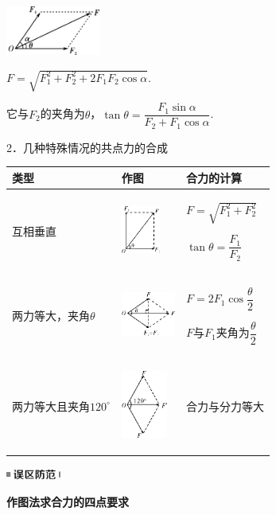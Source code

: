 \begin{center}\includegraphics[width=1.21875in,height=0.63542in]{media/image64.png}\end{center}

$F=\sqrt{F_1^2+F_2^2+2F_1F_2\cos\alpha}$.

它与$F_2$的夹角为$\theta$，$\tan \theta=\dfrac{F_1\sin\alpha}{F_2+F_1\cos\alpha}$.

2．几种特殊情况的共点力的合成

\begin{longtable}[]{@{}m{4cm}m{3cm}m{3cm}@{}}
\toprule
类型 & 作图 & 合力的计算\tabularnewline
\midrule
\endhead

互相垂直& \begin{center}\includegraphics[width=0.5in]{media/image65.png}\end{center}&
$F=\sqrt{F_1^2+F_2^2}$

$\tan\theta=\dfrac{F_1}{F_2}$\tabularnewline

两力等大，夹角$\theta$ &
\begin{center}\includegraphics[width=0.7in,]{media/image66.png}\end{center}
&
$F=2F_1\cos\dfrac{\theta}{2}$

$F$与$F_1$夹角为$\dfrac{\theta}{2}$\tabularnewline
两力等大且夹角$120^\circ$ &
\begin{center}
	\includegraphics[width=0.6in]{media/image67.png}
\end{center}
 &
合力与分力等大\tabularnewline
\bottomrule
\end{longtable}

\begin{center}\includegraphics[width=0.70833in,height=0.125in]{media/image34.png}\end{center}
\begin{center}
	\textbf{作图法求合力的四点要求}
\end{center}

